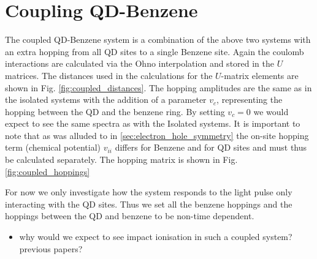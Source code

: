 \section{Coupling QD-Benzene}
    The coupled QD-Benzene system is a combination of the above two systems with an extra hopping from all QD sites to a single Benzene site. Again the coulomb interactions are calculated via the Ohno interpolation and stored in the $U$ matrices. The distances used in the calculations for the $U$-matrix elements are shown in Fig. \ref{fig:coupled_distances}. The hopping amplitudes are the same as in the isolated systems with the addition of a parameter $v_c$, representing the hopping between the QD and the benzene ring. By setting $v_c = 0$ we would expect to see the same spectra as with the Isolated systems. It is important to note that as was alluded to in \ref{sec:electron_hole_symmetry} the on-site hopping term (chemical potential) $v_{ii}$ differs for Benzene and for QD sites and must thus be calculated separately. The hopping matrix is shown in Fig. \ref{fig:coupled_hoppings}
    \medskip
    
    For now we only investigate how the system responds to the light pulse only interacting with the QD sites. Thus we set all the benzene hoppings and the hoppings between the QD and benzene to be non-time dependent.

\begin{itemize}
    \item {\color{red} why would we expect to see impact ionisation in such a coupled system? previous papers?}
\end{itemize}

\usetikzlibrary{matrix, positioning}

\newcommand{\my}{|[fill=myellow]|}
\renewcommand{\mg}{|[fill=mgreen]|}



